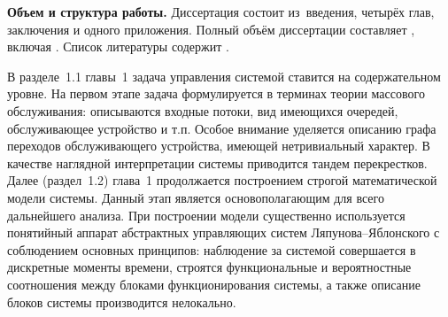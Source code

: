 







\textbf{Объем и структура работы.} Диссертация состоит из~введения, четырёх глав, заключения и одного приложения. 
%
Полный объём диссертации составляет
, включая
. %
 Список литературы содержит  
.

В разделе~1.1 главы~1 задача управления системой ставится на содержательном уровне. На первом этапе задача формулируется в терминах теории массового обслуживания: описываются входные потоки, вид имеющихся очередей, обслуживающее устройство и т.п. Особое внимание уделяется описанию графа переходов обслуживающего устройства, имеющей нетривиальный характер. В качестве наглядной интерпретации системы приводится тандем перекрестков. Далее (раздел~1.2) глава~1 продолжается  построением строгой математической модели системы. Данный этап является основополагающим для всего дальнейшего анализа.  При построении модели существенно используется понятийный аппарат абстрактных управляющих систем Ляпунова--Яблонского с соблюдением основных принципов: наблюдение за системой совершается в дискретные моменты времени,  строятся функциональные и вероятностные соотношения между блоками функционирования системы, а также описание блоков системы производится нелокально.


